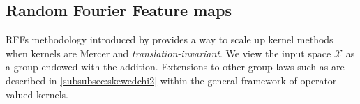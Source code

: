 \documentclass[twoside,11pt]{article}
\begin{document}
\subsection{Random Fourier Feature maps}
\aclp{RFF} methodology introduced  by \citet{Rahimi2007} provides a
way to scale up kernel methods when kernels are Mercer and
\emph{translation-invariant}.  We view the input space $\mathcal{X}$ as a group
endowed with the addition. Extensions to other group laws such as
\citet{li2010random} are described in \cref{subsubsec:skewedchi2} within the
general framework of operator-valued kernels.
\end{document}
